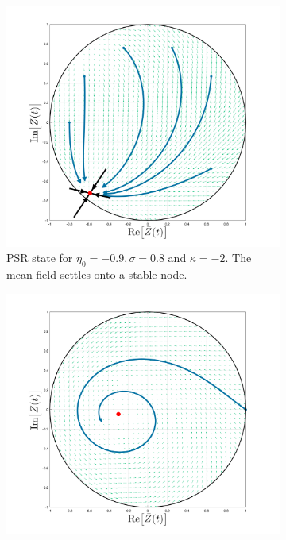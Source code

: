 \begin{figure}[H]
\centering
\begin{subfigure}[b]{0.32\linewidth}
   \centering
  \includegraphics[width=\linewidth, trim={2cm 1cm 2cm 1.5cm },clip]{../Figures/PhaseSpace/MFRPSR.png}
   \caption{PSR state for $\eta_0 = -0.9, \sigma = 0.8$ and $\kappa= -2$. The mean field settles onto a stable node.}
   \label{fig:MFRPSR} 
\end{subfigure} \hfill
\begin{subfigure}[b]{0.32\linewidth}
   \centering
  \includegraphics[width=\linewidth, trim={2cm 1cm 2cm 1.5cm },clip]{../Figures/PhaseSpace/MFRPSS.png}

\end{subfigure}
\end{figure}
